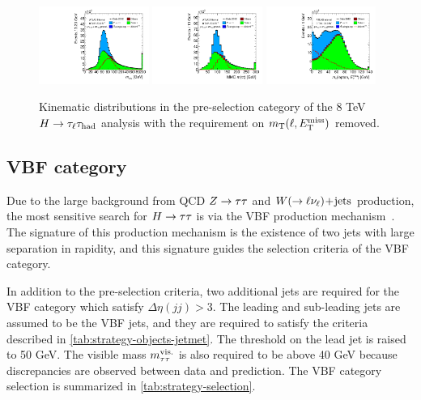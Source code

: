 \begin{figure}[tp]
  \includegraphics[width=0.32\textwidth]{figures/presel/mvis}
  \includegraphics[width=0.32\textwidth]{figures/presel/mMMC}
  \includegraphics[width=0.32\textwidth]{figures/presel/mT-hi} \\
  \caption{Kinematic distributions in the pre-selection category of the 8 TeV $H\rightarrow\tau_\ell\tau_\text{had}$ analysis with the requirement on $m_\text{T}(\ell, E_{\mathrm{T}}^{\mathrm{miss}})$ removed.}
  \label{fig:stategy-presel-2}
\end{figure}

\subsection{VBF category}
\label{sec:strategy-VBF}

Due to the large background from QCD $Z\rightarrow\tau\tau$ and $W (\rightarrow \ell\nu_\ell)\!+\!\text{jets}$ production, the most sensitive search for $H\rightarrow\tau\tau$ is via the VBF production mechanism~\cite{1998.vbfhtautau}. The signature of this production mechanism is the existence of two jets with large separation in rapidity, and this signature guides the selection criteria of the VBF category.

In addition to the pre-selection criteria, two additional jets are required for the VBF category which satisfy $\Delta\eta(jj) > 3$. The leading and sub-leading jets are assumed to be the VBF jets, and they are required to satisfy the criteria described in \cref{tab:strategy-objects-jetmet}. The threshold on the lead jet is raised to 50 GeV. The visible mass $m_{\tau\tau}^\text{vis.}$ is also required to be above 40 GeV because discrepancies are observed between data and prediction. The VBF category selection is summarized in \cref{tab:strategy-selection}.

